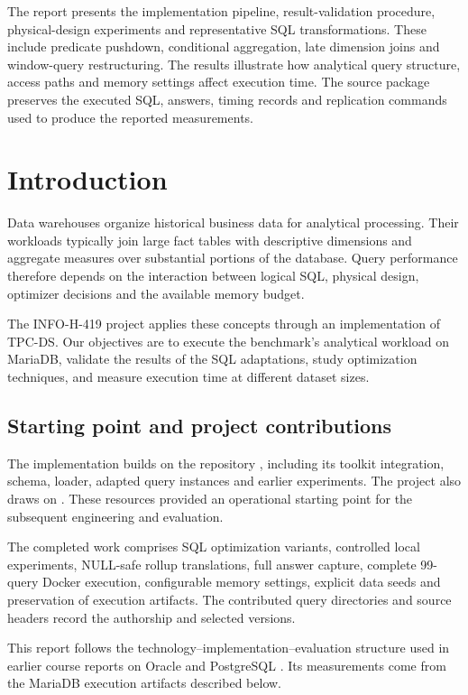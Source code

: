\documentclass[11pt,a4paper]{article}
\DeclareRobustCommand{\file}[1]{\path{#1}}
\begin{document}
The report presents the implementation pipeline, result-validation procedure,
physical-design experiments and representative SQL transformations. These
include predicate pushdown, conditional aggregation, late dimension joins and
window-query restructuring. The results illustrate how analytical query
structure, access paths and memory settings affect execution time. The source
package preserves the executed SQL, answers, timing records and replication
commands used to produce the reported measurements.

\tableofcontents
\clearpage
{}

\section{Introduction}
Data warehouses organize historical business data for analytical processing.
Their workloads typically join large fact tables with descriptive dimensions
and aggregate measures over substantial portions of the database. Query
performance therefore depends on the interaction between logical SQL,
physical design, optimizer decisions and the available memory budget.

The INFO-H-419 project applies these concepts through an implementation of
TPC-DS. Our objectives are to execute the benchmark's analytical workload on
MariaDB, validate the results of the SQL adaptations, study optimization
techniques, and measure execution time at different dataset sizes.

\subsection{Starting point and project contributions}
The implementation builds on the \file{mariadb-tpcds} repository
\citep{repository}, including its toolkit integration, schema, loader, adapted
query instances and earlier experiments. The project also draws on
\file{tpcds-run-tool} \citep{referenceimplementation}. These resources provided
an operational starting point for the subsequent engineering and evaluation.

The completed work comprises SQL optimization variants, controlled local
experiments, NULL-safe rollup translations, full answer capture, complete
99-query Docker execution, configurable memory settings, explicit data seeds
and preservation of execution artifacts. The contributed query directories
and source headers record the authorship and selected versions.

This report follows the technology--implementation--evaluation structure used
in earlier course reports on Oracle and PostgreSQL
\citep{oracleexample,postgresexample}. Its measurements come from the MariaDB
execution artifacts described below.
\end{document}
